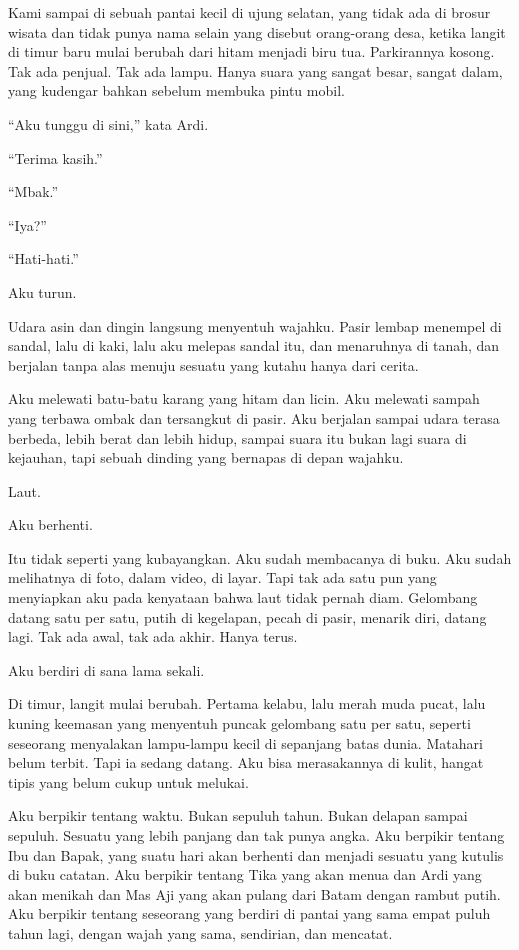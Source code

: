 \documentclass[11pt,twoside,openany]{book}
\begin{document}
Kami sampai di sebuah pantai kecil di ujung selatan, yang tidak ada di brosur wisata dan tidak punya nama selain yang disebut orang-orang desa, ketika langit di timur baru mulai berubah dari hitam menjadi biru tua. Parkirannya kosong. Tak ada penjual. Tak ada lampu. Hanya suara yang sangat besar, sangat dalam, yang kudengar bahkan sebelum membuka pintu mobil.

``Aku tunggu di sini,'' kata Ardi.

``Terima kasih.''

``Mbak.''

``Iya?''

``Hati-hati.''

Aku turun.

Udara asin dan dingin langsung menyentuh wajahku. Pasir lembap menempel di sandal, lalu di kaki, lalu aku melepas sandal itu, dan menaruhnya di tanah, dan berjalan tanpa alas menuju sesuatu yang kutahu hanya dari cerita.

Aku melewati batu-batu karang yang hitam dan licin. Aku melewati sampah yang terbawa ombak dan tersangkut di pasir. Aku berjalan sampai udara terasa berbeda, lebih berat dan lebih hidup, sampai suara itu bukan lagi suara di kejauhan, tapi sebuah dinding yang bernapas di depan wajahku.

Laut.

Aku berhenti.

Itu tidak seperti yang kubayangkan. Aku sudah membacanya di buku. Aku sudah melihatnya di foto, dalam video, di layar. Tapi tak ada satu pun yang menyiapkan aku pada kenyataan bahwa laut tidak pernah diam. Gelombang datang satu per satu, putih di kegelapan, pecah di pasir, menarik diri, datang lagi. Tak ada awal, tak ada akhir. Hanya terus.

Aku berdiri di sana lama sekali.

Di timur, langit mulai berubah. Pertama kelabu, lalu merah muda pucat, lalu kuning keemasan yang menyentuh puncak gelombang satu per satu, seperti seseorang menyalakan lampu-lampu kecil di sepanjang batas dunia. Matahari belum terbit. Tapi ia sedang datang. Aku bisa merasakannya di kulit, hangat tipis yang belum cukup untuk melukai.

Aku berpikir tentang waktu. Bukan sepuluh tahun. Bukan delapan sampai sepuluh. Sesuatu yang lebih panjang dan tak punya angka. Aku berpikir tentang Ibu dan Bapak, yang suatu hari akan berhenti dan menjadi sesuatu yang kutulis di buku catatan. Aku berpikir tentang Tika yang akan menua dan Ardi yang akan menikah dan Mas Aji yang akan pulang dari Batam dengan rambut putih. Aku berpikir tentang seseorang yang berdiri di pantai yang sama empat puluh tahun lagi, dengan wajah yang sama, sendirian, dan mencatat.
\end{document}
